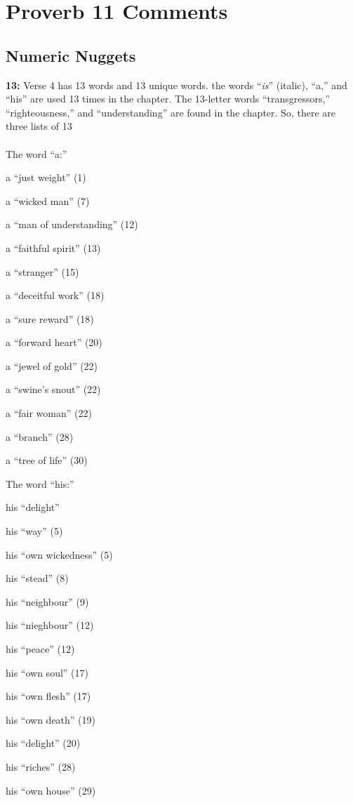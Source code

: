 \section{Proverb 11 Comments}

\subsection{Numeric Nuggets}
\textbf{13:} Verse 4 has 13 words and 13 unique words. the words ``\emph{is}'' (italic), ``a,'' and ``his'' are used 13 times in the chapter. The 13-letter words ``transgressors,'' ``righteousness,'' and ``understanding'' are found in the chapter. So, there are three lists of 13\\
\\
The word ``a:''
\begin{compactenum}
    \item a ``just weight'' (1)
    \item a ``wicked man'' (7)
    \item a ``man of understanding'' (12)
    \item a ``faithful spirit'' (13)
    \item a ``stranger'' (15)
    \item a ``deceitful work'' (18)
    \item a ``sure reward'' (18)
    \item a ``forward heart'' (20)
    \item a ``jewel of gold'' (22)
    \item a ``swine's snout'' (22)
    \item a ``fair woman'' (22)
    \item a ``branch'' (28)
    \item a ``tree of life'' (30)\\
\end{compactenum}
The word ``his:''
\begin{compactenum}
    \item his ``delight''
    \item his ``way'' (5)
    \item his ``own wickedness'' (5)
    \item his ``stead'' (8)
    \item his ``neighbour'' (9)
    \item his ``nieghbour'' (12)
    \item his ``peace'' (12)
    \item his ``own soul'' (17)
    \item his ``own flesh'' (17)
    \item his ``own death'' (19)
    \item his ``delight'' (20)
    \item his ``riches'' (28)
    \item his ``own house'' (29)\\
\end{compactenum}
